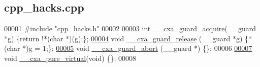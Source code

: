 \hypertarget{cpp__hacks_8cpp_source}{
\subsection{cpp\_\-hacks.cpp}
}

\begin{DoxyCode}
00001 \textcolor{preprocessor}{#include "cpp\_hacks.h"}
00002 
\hypertarget{cpp__hacks_8cpp_source_l00003}{}\hyperlink{cpp__hacks_8cpp_ad9a42607fb7932f44ba914ac49972e62}{00003} \textcolor{keywordtype}{int} \hyperlink{cpp__hacks_8h_a239ddd7f6e7ee1b05b59b2e56d8afb40}{__cxa_guard_acquire}(\_\_guard *g) \{\textcolor{keywordflow}{return} !*(\textcolor{keywordtype}{char} *)(g);\}; 
\hypertarget{cpp__hacks_8cpp_source_l00004}{}\hyperlink{cpp__hacks_8cpp_adef76ddddaddf969efa3bfad968fd430}{00004} \textcolor{keywordtype}{void} \hyperlink{cpp__hacks_8h_aab72c37f0b3e6fc38d293bd4f8dd61ed}{__cxa_guard_release} (\_\_guard *g) \{*(\textcolor{keywordtype}{char} *)g = 1;\}; 
\hypertarget{cpp__hacks_8cpp_source_l00005}{}\hyperlink{cpp__hacks_8cpp_a357afb2dc20a652447f3a529dbda60e4}{00005} \textcolor{keywordtype}{void} \hyperlink{cpp__hacks_8h_a357afb2dc20a652447f3a529dbda60e4}{__cxa_guard_abort} (\_\_guard *) \{\}; 
00006 
\hypertarget{cpp__hacks_8cpp_source_l00007}{}\hyperlink{cpp__hacks_8cpp_a4464d4205cf92370b8d5077d93bc48a6}{00007} \textcolor{keywordtype}{void} \hyperlink{cpp__hacks_8h_a4464d4205cf92370b8d5077d93bc48a6}{__cxa_pure_virtual}(\textcolor{keywordtype}{void}) \{\}; 
00008 
\end{DoxyCode}
